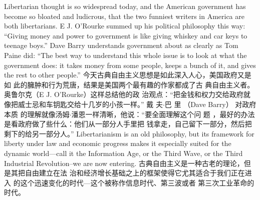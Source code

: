 \begin{paracol}{2}
\switchcolumn*
Libertarian thought is so widespread today, and the American government has become so bloated and ludicrous, that the
two funniest writers in America are both libertarians. E J.
O'Rourke summed up his political philosophy this way: ``Giving money and power to government is like giving whiskey and
car keys to teenage boys.'' Dave Barry understands government
about as clearly as Tom Paine did: ``The best way to understand
this whole issue is to look at what the government does: it takes
money from some people, keeps a bunch of it, and gives the rest
to other people.''
\switchcolumn
今天古典自由主义思想是如此深入人心，美国政府又是如
此的臃肿和行为荒唐，结果是美国两个最有趣的作家都成了古
典自由主义者。奥鲁尔克（E J. O’Rourke）这样总结他的政
治观点：“把金钱和权力交给政府就像把威士忌和车钥匙交给十几岁的小孩一样。” 戴 夫$\cdot$巴 里 （Dave Barry） 对政府本质
的理解就像汤姆$\cdot$潘恩一样清晰，他说：“要全面理解这个问
题 ，最好的办法是看政府做了些什么：他们从一部分人手里把
钱拿走，自己留下一部分，然后把剩下的给另一部分人。”
\switchcolumn*
Libertarianism is an old philosophy, but its framework for
liberty under law and economic progress makes it especially
suited for the dynamic world---call it the Information Age, or
the Third Wave, or the Third Industrial Revolution--we are
now entering.
\switchcolumn
古典自由主义是一种古老的理论，但是其把自由建立在法
治和经济增长基础之上的框架使得它尤其适合于我们正在进入
的这个迅速变化的时代---这个被称作信息时代、第三波或者
第三次工业革命的时代。


\end{paracol}
